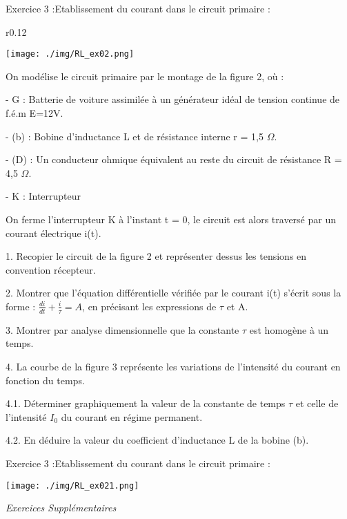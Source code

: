 \documentclass[12pt, french]{article}
\begin{document}
\begin{Box2}{Exercice 3 :Etablissement du courant dans le circuit primaire : }
\begin{wrapfigure}{r}{0.12\textwidth}
  \begin{center}
	\texttt{[image: ./img/RL\_ex02.png]}
  \end{center}
\end{wrapfigure}
	On modélise le circuit primaire par le montage de la figure 2, où :
	
 -  G : Batterie de voiture assimilée à un générateur idéal de
tension continue de f.é.m E=12V.

- (b) : Bobine d’inductance L et de résistance interne r = 1,5 $\Omega$.

- (D) : Un conducteur ohmique équivalent au reste du circuit de
résistance R = 4,5 $\Omega$.

- K : Interrupteur

On ferme l’interrupteur K à l’instant t = 0, le circuit est alors
traversé par un courant électrique i(t).

1. Recopier le circuit de la figure 2 et représenter dessus les tensions en convention récepteur.

2. Montrer que l’équation différentielle vérifiée par le courant i(t) s’écrit sous la forme : $\frac{di}{dt} + \frac{i}{\tau} = A$, en précisant les expressions de $\tau$ et A.

3. Montrer par analyse dimensionnelle que la constante $\tau$ est homogène à un temps.

4. La courbe de la figure 3 représente les variations de
l’intensité du courant en fonction du temps.

4.1. Déterminer graphiquement la valeur de la
constante de temps $\tau$ et celle de l’intensité $I_0$ du
courant en régime permanent.

4.2. En déduire la valeur du coefficient d’inductance L
de la bobine (b).

\end{Box2}


\begin{Box2}{Exercice 3 :Etablissement du courant dans le circuit primaire :  }
  \begin{center}
	\texttt{[image: ./img/RL\_ex021.png]}
  \end{center}


\end{Box2}
\begin{center}
\vspace{-0.7cm}
   \Large{ \em{Exercices Supplémentaires}}
\end{center}
\end{document}
